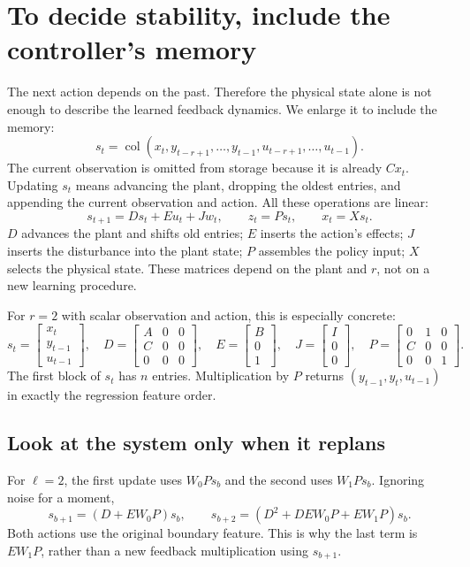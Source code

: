 \documentclass[12 pt]{article}        	%
\newcommand{\C}[0]{\mathbb{C}}
\theoremstyle{definition}
\begin{document}
\section{To decide stability, include the controller's memory}
The next action depends on the past. Therefore the physical state alone is not enough to describe the learned feedback dynamics. We enlarge it to include the memory:
\[
s_t=\operatorname{col}(x_t,y_{t-r+1},\ldots,y_{t-1},u_{t-r+1},\ldots,u_{t-1}).
\]
The current observation is omitted from storage because it is already $Cx_t$. Updating $s_t$ means advancing the plant, dropping the oldest entries, and appending the current observation and action. All these operations are linear:
\[
s_{t+1}=Ds_t+Eu_t+Jw_t,\qquad z_t=Ps_t,\qquad x_t=Xs_t.
\]
$D$ advances the plant and shifts old entries; $E$ inserts the action's effects; $J$ inserts the disturbance into the plant state; $P$ assembles the policy input; $X$ selects the physical state. These matrices depend on the plant and $r$, not on a new learning procedure.

For $r=2$ with scalar observation and action, this is especially concrete:
\[
s_t=\begin{bmatrix}x_t\\y_{t-1}\\u_{t-1}\end{bmatrix},\quad
D=\begin{bmatrix}A&0&0\\C&0&0\\0&0&0\end{bmatrix},\quad
E=\begin{bmatrix}B\\0\\1\end{bmatrix},\quad
J=\begin{bmatrix}I\\0\\0\end{bmatrix},\quad
P=\begin{bmatrix}0&1&0\\C&0&0\\0&0&1\end{bmatrix}.
\]
The first block of $s_t$ has $n$ entries. Multiplication by $P$ returns $(y_{t-1},y_t,u_{t-1})$ in exactly the regression feature order.

\subsection{Look at the system only when it replans}
For $\ell=2$, the first update uses $W_0Ps_b$ and the second uses $W_1Ps_b$. Ignoring noise for a moment,
\[
s_{b+1}=(D+EW_0P)s_b,\qquad
s_{b+2}=(D^2+DEW_0P+EW_1P)s_b.
\]
Both actions use the original boundary feature. This is why the last term is $EW_1P$, rather than a new feedback multiplication using $s_{b+1}$.
\end{document}
